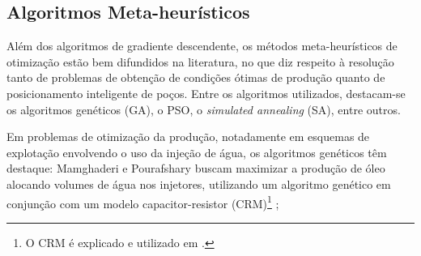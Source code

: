 \subsection{Algoritmos Meta-heurísticos}
Além dos algoritmos de gradiente descendente, os métodos meta-heurísticos de otimização estão bem difundidos na literatura, no que diz respeito à resolução tanto de problemas de obtenção de condições ótimas de produção quanto de posicionamento inteligente de poços. Entre os algoritmos utilizados, destacam-se os algoritmos genéticos (GA), o PSO, o \textit{simulated annealing} (SA), entre outros.

Em problemas de otimização da produção, notadamente em esquemas de explotação envolvendo o uso da injeção de água, os algoritmos genéticos têm destaque: Mamghaderi e Pourafshary buscam maximizar a produção de óleo alocando volumes de água nos injetores, utilizando um algoritmo genético em conjunção com um modelo capacitor-resistor (CRM)\footnote{O CRM é explicado e utilizado em \cite{SAYARPOUR2009227}.} \cite{MAMGHADERI2013107}; 
